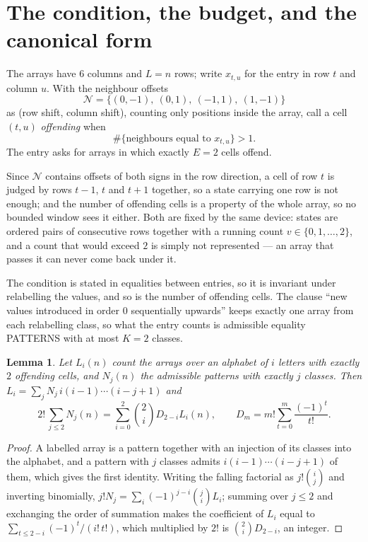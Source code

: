 \documentclass[11pt,a4paper]{article}
\theoremstyle{plain}
\newtheorem{lemma}[theorem]{Lemma}
\theoremstyle{definition}
\begin{document}
\section{The condition, the budget, and the canonical form}

The arrays have $6$ columns and $L=n$ rows; write $x_{t,u}$ for the entry in
row $t$ and column $u$. With the neighbour offsets
\[
\mathcal N=\{(0,-1),\ (0,1),\ (-1,1),\ (1,-1)\}
\]
as (row shift, column shift), counting only positions inside the array, call a cell
$(t,u)$ \emph{offending} when
\[
\#\{\text{neighbours equal to }x_{t,u}\}>1 .
\]
The entry asks for arrays in which exactly $E=2$ cells offend.

Since $\mathcal N$ contains offsets of both signs in the row direction, a cell of row
$t$ is judged by rows $t-1$, $t$ and $t+1$ together, so a state carrying one row is not
enough; and the number of offending cells is a property of the whole array, so no bounded
window sees it either. Both are fixed by the same device: states are ordered pairs of
consecutive rows together with a running count $v\in\{0,1,\dots,2\}$, and a count that
would exceed $2$ is simply not represented --- an array that passes it can never come back
under it.

The condition is stated in equalities between entries, so it is invariant under relabelling
the values, and so is the number of offending cells. The clause ``new values introduced in
order $0$ sequentially upwards'' keeps exactly one array from each relabelling class, so what
the entry counts is admissible equality PATTERNS with at most $K=2$ classes.

\begin{lemma}\label{lem:inv}
Let $L_i(n)$ count the arrays over an alphabet of $i$ letters with exactly $2$ offending
cells, and $N_j(n)$ the admissible patterns with exactly $j$ classes. Then
$L_i=\sum_j N_j\,i(i-1)\cdots(i-j+1)$ and
\[
2!\,\sum_{j\le2}N_j(n)=\sum_{i=0}^{2}\binom{2}{i}D_{2-i}L_i(n),
\qquad D_m=m!\sum_{t=0}^{m}\frac{(-1)^t}{t!} .
\]
\end{lemma}

\begin{proof}
A labelled array is a pattern together with an injection of its classes into the alphabet,
and a pattern with $j$ classes admits $i(i-1)\cdots(i-j+1)$ of them, which gives the first
identity. Writing the falling factorial as $j!\binom{i}{j}$ and inverting binomially,
$j!N_j=\sum_i(-1)^{j-i}\binom{j}{i}L_i$; summing over $j\le2$ and exchanging the
order of summation makes the coefficient of $L_i$ equal to
$\sum_{t\le2-i}(-1)^t/(i!\,t!)$, which multiplied by $2!$ is
$\binom{2}{i}D_{2-i}$, an integer.
\end{proof}
\end{document}
